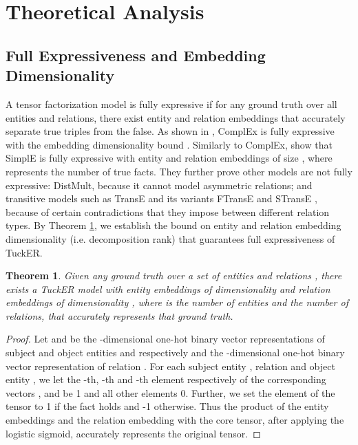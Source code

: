 \documentclass[11pt,a4paper]{article}
\newtheorem{theorem}{Theorem}
\begin{document}
\section{Theoretical Analysis}
\subsection{Full Expressiveness and Embedding Dimensionality} \label{sec:expressive}

A tensor factorization model is fully expressive if for any ground truth over all entities and relations, there exist entity and relation embeddings that accurately separate true triples from the false. As shown in \cite{trouillon2017knowledge}, ComplEx is fully expressive with the embedding dimensionality bound . Similarly to ComplEx, \citet{kazemi2018simple} show that SimplE is fully expressive with entity and relation embeddings of size , where  represents the number of true facts. They further prove other models are not fully expressive: DistMult, because it cannot model asymmetric relations; and transitive models such as TransE \cite{bordes2013translating} and its variants FTransE \cite{feng2016knowledge} and STransE \cite{nguyen2016stranse}, because of certain contradictions that they impose between different relation types. By Theorem \ref{theorem1}, we establish the bound on entity and relation embedding dimensionality (i.e. decomposition rank) that guarantees full expressiveness of TuckER.

\begin{theorem} \label{theorem1}
Given any ground truth over a set of entities  and relations , there exists a TuckER model with entity embeddings of dimensionality  and relation embeddings of dimensionality , where  is the number of entities and  the number of relations, that accurately represents that ground truth.
\end{theorem} 
\vspace{-0.2cm}
\begin{proof}
Let  and  be the -dimensional one-hot binary vector representations of subject and object entities  and  respectively and  the -dimensional one-hot binary vector representation of relation . For each subject entity , relation  and object entity , we let the -th, -th and -th element respectively of the corresponding vectors ,  and  be 1 and all other elements 0. Further, we set the  element of the tensor  to 1 if the fact  holds and -1 otherwise. Thus the product of the entity embeddings and the relation embedding with the core tensor, after applying the logistic sigmoid, accurately represents the original tensor.
\end{proof}
\end{document}
